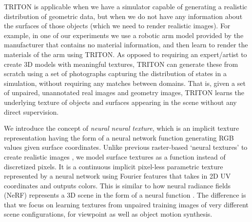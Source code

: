 \documentclass{article}
\begin{document}
TRITON is applicable when we have a simulator capable of generating a realistic distribution of geometric data, but when we do not have any information about the surfaces of those objects (which we need to render realistic images). For example, in one of our experiments we use a robotic arm model provided by the manufacturer that contains no material information, and then learn to render the materials of the arm using TRITON.
As opposed to requiring an expert/artist to create 3D models with meaningful textures, TRITON can generate these from scratch using a set of photographs capturing the distribution of states in a simulation, without requiring any matches between domains. 
That is, given a set of unpaired, unannotated real images and geometry images, TRITON learns the underlying texture of objects and surfaces appearing in the scene without any direct supervision.


We introduce the concept of \emph{neural neural texture}, which is an implicit texture representation having the form of a neural network function generating RGB values given surface coordinates.
Unlike previous raster-based `neural textures' to create realistic images \cite{deferred_neural_rendering,surgical_video_translation}, we model surface textures as a function instead of discretized pixels.
It is a continuous implicit pixel-less parametric texture represented by a neural network using Fourier features \cite{fourier_feature_networks} that takes in 2D UV coordinates and outputs colors. This is similar to how neural radiance fields (NeRF) represents a 3D scene in the form of a neural function \cite{nerf}. The difference is that we focus on learning textures from unpaired training images of very different scene configurations, for viewpoint as well as object motion synthesis.


\end{document}
